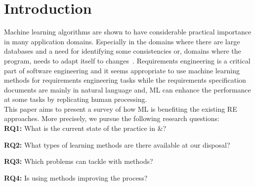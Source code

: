 \section{Introduction}

% 
% 
% 
% 
Machine learning algorithms are shown to have considerable practical importance in many application domains. Especially in the domains where there are large databases and a need for identifying some consistencies or, domains where the program, needs to adapt itself to changes~\cite{Zhang2002}. Requirements engineering is a critical part of software engineering and it seems appropriate to use machine learning methods for requirements engineering tasks while the requirements specification documents are mainly in natural language and, ML can enhance the performance at some tasks by replicating human processing. \\
This paper aims to present a survey of how ML is benefiting the existing RE approaches. More precisely, we pursue the following research questions: \\
\noindent
\textbf{RQ1:} What is the current state of the practice in \ML${\&}$\RE?

\noindent
\textbf{RQ2:} What types of learning methods are there available at our disposal?

\noindent
\textbf{RQ3:} Which \RE problems can tackle with \ML methods?

\noindent
\textbf{RQ4:} Is using \ML methods improving the \RE process?

